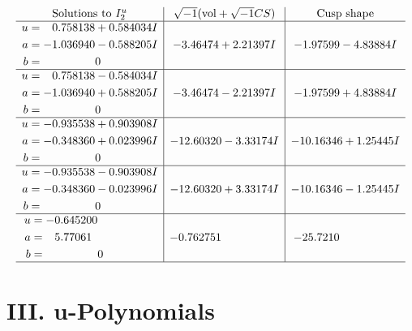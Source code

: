 \documentclass[1p]{elsarticle_modified}
\theoremstyle{definition}
\newcommand{\I}{\sqrt{-1}}
\begin{document}
$$\begin{array}{c|c|c}  
\text{Solutions to }I^u_{2}& \I (\text{vol} + \sqrt{-1}CS) & \text{Cusp shape}\\
 \hline 
\begin{aligned}
u &= \phantom{-}0.758138 + 0.584034 I \\
a &= -1.036940 - 0.588205 I \\
b &= \phantom{-0.000000 } 0\end{aligned}
 & -3.46474 + 2.21397 I & -1.97599 - 4.83884 I \\ \hline\begin{aligned}
u &= \phantom{-}0.758138 - 0.584034 I \\
a &= -1.036940 + 0.588205 I \\
b &= \phantom{-0.000000 } 0\end{aligned}
 & -3.46474 - 2.21397 I & -1.97599 + 4.83884 I \\ \hline\begin{aligned}
u &= -0.935538 + 0.903908 I \\
a &= -0.348360 + 0.023996 I \\
b &= \phantom{-0.000000 } 0\end{aligned}
 & -12.60320 - 3.33174 I & -10.16346 + 1.25445 I \\ \hline\begin{aligned}
u &= -0.935538 - 0.903908 I \\
a &= -0.348360 - 0.023996 I \\
b &= \phantom{-0.000000 } 0\end{aligned}
 & -12.60320 + 3.33174 I & -10.16346 - 1.25445 I \\ \hline\begin{aligned}
u &= -0.645200\phantom{ +0.000000I} \\
a &= \phantom{-}5.77061\phantom{ +0.000000I} \\
b &= \phantom{-0.000000 } 0\end{aligned}
 & -0.762751\phantom{ +0.000000I} & -25.7210\phantom{ +0.000000I}\\
 \hline 
 \end{array}$$\newpage
\newpage\renewcommand{\arraystretch}{1}
\centering \section*{ III. u-Polynomials}
\end{document}
